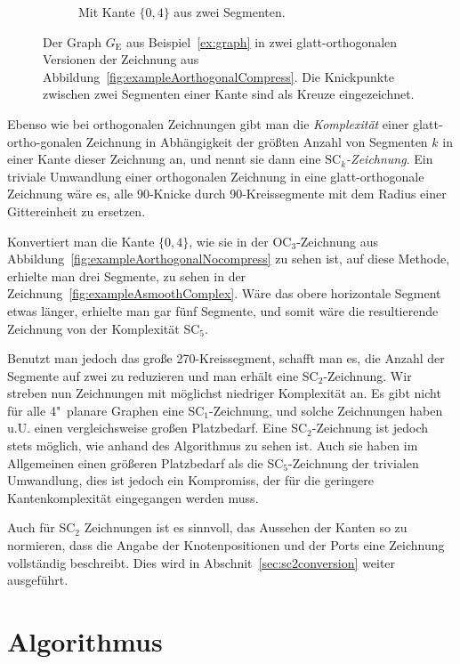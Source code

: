 \documentclass[a4paper]{scrreprt}
\theoremstyle{definition}
\begin{document}
\begin{figure}[h]
\begin{subfigure}[b]{0.6\textwidth}
  \caption{Mit Kante $\{0,4\}$ aus zwei Segmenten.}
  \label{fig:exampleAsmoothSimple}
\end{subfigure}
  \caption{Der Graph $G_\text{E}$ aus Beispiel~\ref{ex:graph} in zwei glatt-orthogonalen Versionen der Zeichnung aus Abbildung~\ref{fig:exampleAorthogonalCompress}. Die Knickpunkte zwischen zwei Segmenten einer Kante sind als Kreuze eingezeichnet.}
  \label{fig:exampleAsmooth}
\end{figure}

Ebenso wie bei orthogonalen Zeichnungen gibt man die \emph{Komplexität} einer glatt-ortho-gonalen Zeichnung in Abhängigkeit der größten Anzahl von Segmenten $k$ in einer Kante dieser Zeichnung an, und nennt sie dann eine \emph{$\text{SC}_k$-Zeichnung}. Ein triviale Umwandlung einer orthogonalen Zeichnung in eine glatt-orthogonale Zeichnung wäre es, alle 90\textdegree-Knicke durch 90\textdegree-Kreissegmente mit dem Radius einer Gittereinheit zu ersetzen.

Konvertiert man die Kante $\{0,4\}$, wie sie in der OC$_3$-Zeichnung aus Abbildung~\ref{fig:exampleAorthogonalNocompress} zu sehen ist, auf diese Methode, erhielte man drei Segmente, zu sehen in der Zeichnung~\ref{fig:exampleAsmoothComplex}. Wäre das obere horizontale Segment etwas länger, erhielte man gar fünf Segmente, und somit wäre die resultierende Zeichnung von der Komplexität SC$_5$.

Benutzt man jedoch das große 270\textdegree-Kreissegment, schafft man es, die Anzahl der Segmente auf zwei zu reduzieren und man erhält eine SC$_2$-Zeichnung. Wir streben nun Zeichnungen mit möglichst niedriger Komplexität an. Es gibt nicht für alle 4"~planare Graphen eine SC$_1$-Zeichnung, und solche Zeichnungen haben u.U. einen vergleichsweise großen Platzbedarf. Eine SC$_2$-Zeichnung ist jedoch stets möglich, wie anhand des Algorithmus zu sehen ist. Auch sie haben im Allgemeinen einen größeren Platzbedarf als die SC$_5$-Zeichnung der trivialen Umwandlung, dies ist jedoch ein Kompromiss, der für die geringere Kantenkomplexität eingegangen werden muss. %

Auch für SC$_2$ Zeichnungen ist es sinnvoll, das Aussehen der Kanten so zu normieren, dass die Angabe der Knotenpositionen und der Ports eine Zeichnung vollständig beschreibt. Dies wird in Abschnit~\ref{sec:sc2conversion} weiter ausgeführt.




\chapter{Algorithmus}
\label{chap:algo}
\end{document}
